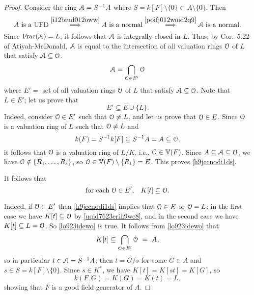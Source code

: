 \begin{proof}
	Consider the ring $\EuScript{A} = S^{-1}A$ where $S =  k[F] \setminus \{0\} \subset A \setminus \{0\}$. 
	Then
	$$
	\text{$A$ is a UFD} \overset{\ref{i12biud012oww}}{\implies} \text{$A$ is a normal}
	\overset{\ref{poifj012woid2q9}}{\implies} \text{$\EuScript{A}$ is a normal} .
	$$
	Since $\operatorname{{\rm Frac}}( \EuScript{A} ) = L$, it follows that $\EuScript{A}$ is integrally closed in $L$. Thus, 
	by Cor.~5.22 of Atiyah-McDonald,
	$\EuScript{A}$ is equal to the intersection of all valuation rings $\EuScript{O}$ 
	of $L$ that satisfy $\EuScript{A} \subseteq \EuScript{O}$.
	\begin{equation} \label {bcdkoi23w9eje}
		\EuScript{A} = \bigcap_{\EuScript{O} \in E'} \EuScript{O}
	\end{equation}
	where $E'=$ set of all valuation rings $\EuScript{O}$ of $L$ that satisfy $\EuScript{A} \subseteq \EuScript{O}$.
	Note that $L \in E'$; let us prove that 
	\begin{equation} \label {h9jccnodi1ds}
		E' \subseteq E \cup \{ L \} .
	\end{equation}
	Indeed, consider $\EuScript{O} \in E'$ such that $\EuScript{O} \neq L$, and let us prove that  $\EuScript{O}  \in E$.
	Since $\EuScript{O}$ is a valuation ring of $L$ such that $\EuScript{O} \neq L$ and
	$$
	 k(F) = S^{-1}  k[F] \subseteq S^{-1}A = \EuScript{A} \subseteq \EuScript{O},
	$$ 
	it follows that $\EuScript{O}$ is a valuation ring of $L/K$, i.e., $\EuScript{O} \in \mathbb{V}(F)$. Since
	$A \subseteq \EuScript{A} \subseteq \EuScript{O}$, we have $\EuScript{O} \notin \{ R_1, \dots, R_s \}$,
	so $\EuScript{O} \in \mathbb{V}(F) \setminus \{R_1\} = E$. This proves \eqref{h9jccnodi1ds}.

	It follows that
	\begin{equation} \label {lo923idewo}
		\text{for each $\EuScript{O} \in E'$,\quad  $K[t] \subseteq \EuScript{O}$.}
	\end{equation}

	Indeed, if $\EuScript{O} \in E'$ then \eqref{h9jccnodi1ds} implies that $\EuScript{O} \in E$ or $\EuScript{O}=L$;
	in the first case we have $K[t] \subseteq \EuScript{O}$ by \eqref{uqid7623erih9we8},
	and in the second case we have $K[t] \subseteq L = \EuScript{O}$. So \eqref{lo923idewo} is true.
	It follows from \eqref{lo923idewo} that
	$$
	K[t] \subseteq \bigcap_{\Oeul \in E'} \Oeul\ =\ \Aeul,
	$$
	so in particular $t \in \EuScript{A} = S^{-1}A$; then $t = G/s$ for 
	some $G \in A$ and $s \in S =  k[F] \setminus \{0\}$.
	Since $s \in K^*$, we have $K[t] = K[st] = K[G]$, so 
	$$
	 k(F,G) = K(G) = K(t) = L,
	$$
	showing that $F$ is a good field generator of $A$.
\end{proof}




